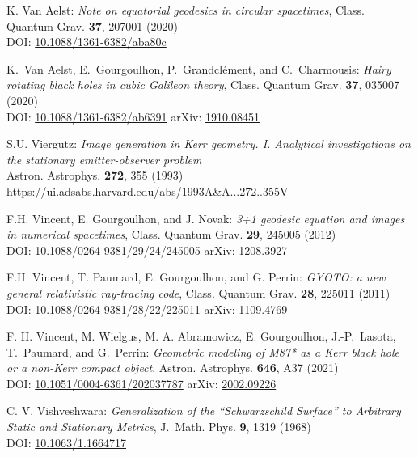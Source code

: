 \begin{thebibliography}{123}
K. Van Aelst: {\em Note on equatorial geodesics in circular spacetimes},
Class. Quantum Grav. {\bf 37}, 207001 (2020)\\
DOI: \href{https://doi.org/10.1088/1361-6382/aba80c}{10.1088/1361-6382/aba80c}

K.~Van Aelst, E.~Gourgoulhon, P.~Grandclément, and C.~Charmousis:
{\em Hairy rotating black holes in cubic Galileon theory},
Class. Quantum Grav. {\bf 37}, 035007 (2020)\\
DOI: \href{https://doi.org/10.1088/1361-6382/ab6391}{10.1088/1361-6382/ab6391}\hfill
arXiv: \href{https://arxiv.org/abs/1910.08451}{1910.08451}

S.U. Viergutz:
{\em Image generation in Kerr geometry. I. Analytical investigations on the stationary emitter-observer problem}\\
Astron. Astrophys. {\bf 272}, 355 (1993)\\
\url{https://ui.adsabs.harvard.edu/abs/1993A&A...272..355V}

F.H. Vincent, E. Gourgoulhon, and J. Novak:
{\em 3+1 geodesic equation and images in numerical spacetimes},
Class. Quantum Grav. {\bf 29}, 245005 (2012)\\
DOI: \href{https://doi.org/10.1088/0264-9381/29/24/245005}{10.1088/0264-9381/29/24/245005}\hfill
arXiv: \href{https://arxiv.org/abs/1208.3927}{1208.3927}

F.H. Vincent, T. Paumard, E. Gourgoulhon, and G. Perrin:
{\em GYOTO: a new general relativistic ray-tracing code},
Class. Quantum Grav. {\bf 28}, 225011 (2011)\\
DOI: \href{https://doi.org/10.1088/0264-9381/28/22/225011}{10.1088/0264-9381/28/22/225011}
\hfill
arXiv: \href{https://arxiv.org/abs/1109.4769}{1109.4769}

F. H. Vincent, M. Wielgus, M. A. Abramowicz, E. Gourgoulhon, J.-P.~Lasota, T.~Paumard,
and G.~Perrin:
{\em Geometric modeling of M87* as a Kerr black hole or a non-Kerr compact object},
Astron. Astrophys. {\bf 646}, A37 (2021)\\
DOI: \href{https://doi.org/10.1051/0004-6361/202037787}{10.1051/0004-6361/202037787}\hfill
arXiv: \href{https://arxiv.org/abs/2002.09226}{2002.09226}

C. V. Vishveshwara:
{\em Generalization of the ``Schwarzschild Surface'' to Arbitrary Static and Stationary Metrics},
J.~Math. Phys. {\bf 9}, 1319 (1968)\\
DOI: \href{https://doi.org/10.1063/1.1664717}{10.1063/1.1664717}


\end{thebibliography}
